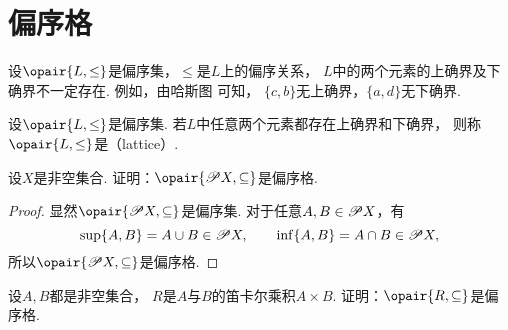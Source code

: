 \section{偏序格}
设\(\opair{L,\leq}\)是偏序集，\(\leq\)是\(L\)上的偏序关系，
\(L\)中的两个元素的上确界及下确界不一定存在.
例如，由哈斯图  可知，
\(\{c,b\}\)无上确界，\(\{a,d\}\)无下确界.

\begin{figure}[htb]
	\centering
	\caption{}
	\label{figure:格论.偏序集1}
\end{figure}

\begin{definition}
设\(\opair{L,\leq}\)是偏序集.
若\(L\)中任意两个元素都存在上确界和下确界，
则称\(\opair{L,\leq}\)是（lattice）.
\end{definition}

\begin{example}
设\(X\)是非空集合.
证明：\(\opair{\Powerset X,\subseteq}\)是偏序格.
\begin{proof}
显然\(\opair{\Powerset X,\subseteq}\)是偏序集.
对于任意\(A,B \in \mathscr{P} X\)，有\[
	\sup\{A,B\}
	= A \cup B
	\in \mathscr{P} X,
	\qquad
	\inf\{A,B\}
	= A \cap B
	\in \mathscr{P} X,
\]
所以\(\opair{\Powerset X,\subseteq}\)是偏序格.
\end{proof}
\end{example}

\begin{example}
设\(A,B\)都是非空集合，
\(R\)是\(A\)与\(B\)的笛卡尔乘积\(A \times B\).
证明：\(\opair{R,\subseteq}\)是偏序格.
\end{example}


